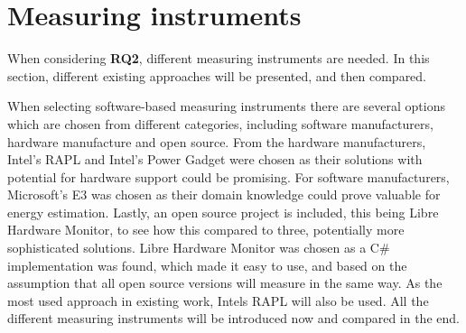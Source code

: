\section{Measuring instruments}\label{sec:measuring_instruments}

When considering \textbf{RQ2}, different measuring instruments are needed. In this section, different existing approaches will be presented, and then compared.

When selecting software-based measuring instruments there are several options which are chosen from different categories, including software manufacturers, hardware manufacture and open source. From the hardware manufacturers, Intel's RAPL and Intel's Power Gadget were chosen as their solutions with potential for hardware support could be promising. For software manufacturers, Microsoft's E3 was chosen as their domain knowledge could prove valuable for energy estimation. Lastly, an open source project is included, this being Libre Hardware Monitor, to see how this compared to three, potentially more sophisticated solutions. Libre Hardware Monitor was chosen as a C\# implementation was found, which made it easy to use, and based on the assumption that all open source versions will measure in the same way. As the most used approach in existing work, Intels RAPL will also be used. All the different measuring instruments will be introduced now and compared in the end.






